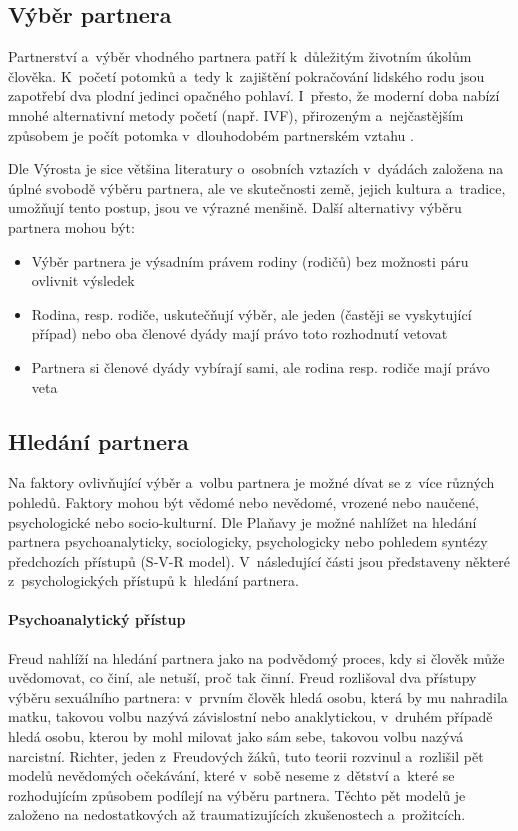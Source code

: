\documentclass[a4paper, 12pt, notitlepage, oneside, numbers=noenddot]{report}
\begin{document}
\subsection{Výběr partnera}
Partnerství a~výběr vhodného partnera patří k~důležitým životním
úkolům člověka.  K~po\-če\-tí potomků a~tedy k~zajištění pokračování
lidského rodu jsou zapotřebí dva plodní jedinci opačného pohlaví.
I~přesto, že moderní doba nabízí mnohé alternativní metody početí
(např. IVF), přirozeným a~nejčastějším způsobem je počít potomka
v~dlouhodobém partnerském vztahu \citep{CSU2006}.

Dle Výrosta \citeyearpar{Vyrost2008} je sice většina literatury o~osobních
vztazích v~dyádách založena na úplné svobodě výběru partnera, ale ve
skutečnosti země, jejich kultura a~tradice, umožňují tento postup, jsou
ve výrazné menšině. Další alternativy výběru partnera mohou být:

\begin{itemize}
\item Výběr partnera je výsadním právem rodiny (rodičů) bez možnosti
  páru ovlivnit výsledek
\item Rodina, resp. rodiče, uskutečňují výběr, ale jeden (častěji se
  vyskytující případ) nebo oba členové dyády mají právo toto
  rozhodnutí vetovat
\item Partnera si členové dyády vybírají sami, ale rodina resp. rodiče
  mají právo veta
\end{itemize}

\subsection{Hledání partnera}
Na faktory ovlivňující výběr a~volbu partnera je možné dívat se z~více
různých pohledů.  Faktory mohou být vědomé nebo nevědomé, vrozené nebo
naučené, psychologické nebo socio-kulturní.  Dle Plaňavy \citeyearpar{Planava1998}
je možné nahlížet na hledání partnera psychoanalyticky, sociologicky,
psychologicky nebo pohledem syntézy předchozích přístupů (S-V-R
model).  V~následující části jsou představeny některé
z~psychologických přístupů k~hledání partnera.

\paragraph{Psychoanalytický přístup}
Freud \citep{Planava1998} nahlíží na hledání partnera jako na
podvědomý proces, kdy si člověk může uvědomovat, co činí, ale netuší,
proč tak činní.  Freud rozlišoval dva přístupy výběru sexuálního
partnera: v~prvním člověk hledá osobu, která by mu nahradila matku,
takovou volbu nazývá závislostní nebo anakly\-tic\-kou, v~druhém případě
hledá osobu, kterou by mohl milovat jako sám sebe, takovou volbu
nazývá narcistní.  Richter, jeden z~Freudových žáků, tuto teorii
rozvinul a~rozlišil pět modelů nevědomých očekávání, které v~sobě
neseme z~dětství a~které se rozhodujícím způsobem podílejí na výběru
partnera. Těchto pět modelů je založeno na nedostatkových až
traumatizujících zkušenostech a~prožitcích.
\end{document}
